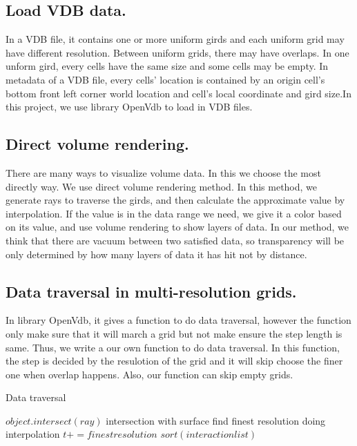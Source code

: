 \documentclass[acmtog]{acmart}
\begin{document}
	\subsection{Load VDB data.}
	In a VDB file, it contains one or more uniform girds and each uniform grid may have different resolution. Between uniform grids, there may have overlaps. In one unform gird, every cells have the same size and some cells may be empty. In metadata of a VDB file, every cells' location is contained by an origin cell's bottom front left corner world location and cell's local coordinate and gird size.In this project, we use library OpenVdb to load in VDB files.
	\subsection{Direct volume rendering.}
	There are many ways to visualize volume data. In this we choose the most directly way. We use direct volume rendering method. In this method, we generate rays to traverse the girds, and then calculate the approximate value by interpolation. If the value is in the data range we need, we give it a color based on its value, and use volume rendering to show layers of data. In our method, we think that there are vacuum between two satisfied data, so transparency will be only determined by how many layers of data it has hit not by distance.    
	\subsection{Data traversal in multi-resolution grids.}
	In library OpenVdb, it gives a function to do data traversal, however the function only make sure that it will march a grid but not make ensure the step length is same. Thus, we write a our own function to do data traversal. In this function, the step is decided by the resulotion of the grid and it will skip choose the finer one when overlap happens. Also, our function can skip empty grids.
	\begin{algorithm}[!h]
		\caption{Data traversal}%
		\begin{algorithmic}[1]%
			\State $ object.intersect(ray)$
			\Comment intersection with surface
				\State  find finest resolution
				\State  doing interpolation
			\EndIf
			\State  $t+=finest resolution$
			\EndWhile
			\State  $sort(interaction list)$
			\EndFunction
		\end{algorithmic}
	\end{algorithm}
\end{document}
